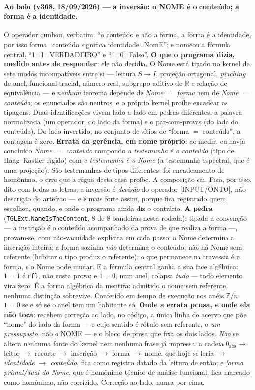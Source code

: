 \documentclass[11pt]{article}
\theoremstyle{definition}\newtheorem{deriv}{Derivação}
\begin{document}
\paragraph*{Ao lado (v368, 18/09/2026) --- a inversão: o NOME é o conteúdo; a forma é a identidade.} O operador cunhou, verbatim: ``o conteúdo e não a forma, a forma é a identidade, por isso forma=conteúdo significa identidade=NomE''; e nomeou a fórmula central, ``1=1=VERDADEIRO'' e ``1=0=Falso''. \textbf{O que o programa dizia, medido antes de responder}: ele não decidia. O Nome está tipado no kernel de sete modos incompatíveis entre si --- leitura $S\to I$, projeção ortogonal, \emph{pinching} de anel, funcional tracial, número real, subgrupo aditivo de $\mathbb{R}$ e relação de equivalência --- e \emph{nenhum} teorema depende de \emph{Nome $=$ forma} nem de \emph{Nome $=$ conteúdo}; os enunciados são neutros, e o próprio kernel proíbe encadear as tipagens. Duas identificações vivem lado a lado em pedras diferentes: a palavra normalizada (um operador, do lado da forma) e o par-com-provas (do lado do conteúdo). Do lado invertido, no conjunto de sítios de ``forma $=$ conteúdo'', a contagem é zero. \textbf{Errata da gerência, em nome próprio}: ao medir, eu havia concluído \emph{Nome $=$ conteúdo} compondo \emph{a testemunha é o conteúdo} (tipo de Haag--Kastler rígido) com \emph{a testemunha é o Nome} (a testemunha espectral, que é uma projeção). São testemunhas de tipos diferentes: foi encadeamento de homônimo, o erro que a régua desta casa proíbe. A composição cai. Fica, por isso, dito com todas as letras: a inversão é \emph{decisão} do operador [INPUT/ONTO], não descrição do artefato --- e é mais forte assim, porque fica registrado quem escolheu, quando, e onde o programa ainda diz o contrário. \textbf{A pedra} (\texttt{TGLExt.NameIsTheContent}, 8 de 8 bandeiras nesta rodada): tipada a convenção --- a inscrição é o conteúdo acompanhado da prova de que realiza a forma ---, provam-se, com não-vacuidade explícita em cada passo: o Nome determina a inscrição inteira; a forma sozinha \emph{não} determina o conteúdo; não há Nome sem referente (habitar o tipo produz o referente); o que permanece na travessia é a forma, e o Nome pode mudar. E a fórmula central ganha a sua face algébrica: $1=1$ é \texttt{rfl}, não custa prova; e $1=0$, num anel, colapsa \emph{tudo} --- todo elemento vira zero. É a forma algébrica da mentira: admitido o nome sem referente, nenhuma distinção sobrevive. Conferido em tempo de execução nos anéis $\mathbb{Z}/n$: $1=0$ se e só se o anel tem um habitante só. \textbf{Onde a errata pousa, e onde ela não toca}: recebem correção ao lado, no código, a única linha do acervo que põe ``nome'' do lado da forma --- e cujo sentido é rótulo sem referente, o \emph{um pressuposto}, não o NOME --- e o bloco de prosa que fixa os dois lados. \emph{Não} se altera nenhuma fonte do kernel nem nenhuma frase já impressa: a cadeia $0_{\mathrm{abs}}\to$ leitor $\to$ recorte $\to$ inscrição $\to$ forma $\to$ nome, que hoje se leria \emph{$\to$ identidade $\to$ conteúdo}, fica como registro datado da leitura de então; e \emph{forma primal/dual do Nome}, que é homônimo técnico de análise funcional, fica marcado como homônimo, não corrigido. Correção ao lado, nunca por cima. 
\end{document}
